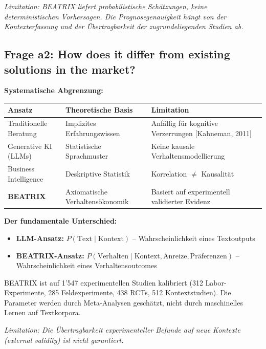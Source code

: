 \documentclass[11pt,a4paper]{article}
\newcommand{\limitation}[1]{\textcolor{limitation}{\textit{Limitation: #1}}}
\newcommand{\evidence}[1]{\textcolor{fehrgray}{[#1]}}
\begin{document}
\limitation{BEATRIX liefert probabilistische Schätzungen, keine deterministischen Vorhersagen. Die Prognosegenauigkeit hängt von der Kontexterfassung und der Übertragbarkeit der zugrundeliegenden Studien ab.}

\subsection{Frage a2: How does it differ from existing solutions in the market?}

\textbf{Systematische Abgrenzung:}

\begin{table}[h]
\centering
\begin{tabular}{@{}L{3.5cm}L{4.5cm}L{5cm}@{}}
\toprule
\textbf{Ansatz} & \textbf{Theoretische Basis} & \textbf{Limitation} \\
\midrule
Traditionelle Beratung & Implizites Erfahrungswissen & Anfällig für kognitive Verzerrungen \evidence{Kahneman, 2011} \\
Generative KI (LLMs) & Statistische Sprachmuster & Keine kausale Verhaltensmodellierung \\
Business Intelligence & Deskriptive Statistik & Korrelation $\neq$ Kausalität \\
\textbf{BEATRIX} & Axiomatische Verhaltensökonomik & Basiert auf experimentell validierter Evidenz \\
\bottomrule
\end{tabular}
\end{table}

\textbf{Der fundamentale Unterschied:}
\begin{itemize}[leftmargin=2em]
    \item \textbf{LLM-Ansatz:} $P(\text{Text} \mid \text{Kontext})$ -- Wahrscheinlichkeit eines Textoutputs
    \item \textbf{BEATRIX-Ansatz:} $P(\text{Verhalten} \mid \text{Kontext}, \text{Anreize}, \text{Präferenzen})$ -- Wahrscheinlichkeit eines Verhaltensoutcomes
\end{itemize}

BEATRIX ist auf 1'547 experimentellen Studien kalibriert (312 Labor-Experimente, 285 Feldexperimente, 438 RCTs, 512 Kontextstudien). Die Parameter werden durch Meta-Analysen geschätzt, nicht durch maschinelles Lernen auf Textkorpora.

\limitation{Die Übertragbarkeit experimenteller Befunde auf neue Kontexte (external validity) ist nicht garantiert.}
\end{document}
